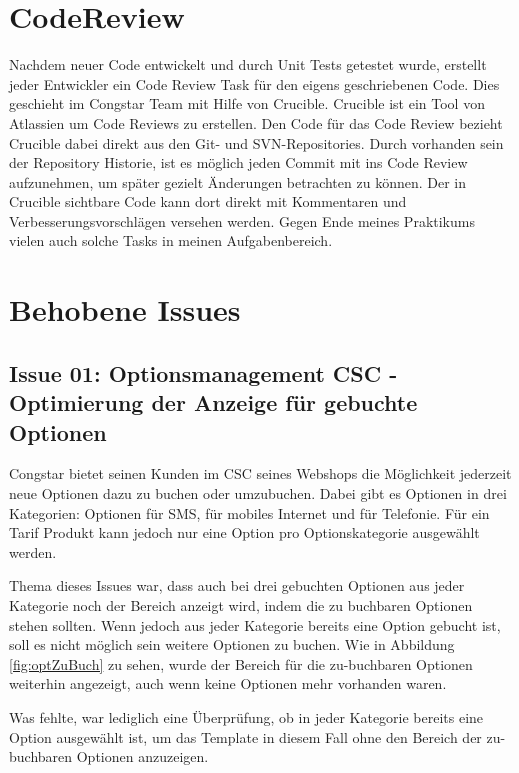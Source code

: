 \documentclass[11pt,a4paper]{article}
\begin{document}
\section{CodeReview}

Nachdem neuer Code entwickelt und durch Unit Tests getestet wurde, erstellt jeder Entwickler ein Code Review Task 
für den eigens geschriebenen Code. Dies geschieht im Congstar Team mit Hilfe von Crucible. Crucible ist ein Tool 
von Atlassien um Code Reviews zu erstellen. Den Code für das Code Review bezieht Crucible dabei direkt
aus den Git- und SVN-Repositories. Durch vorhanden sein der Repository Historie, ist es möglich jeden Commit
mit ins Code Review aufzunehmen, um später gezielt Änderungen betrachten zu können. Der in Crucible sichtbare Code
kann dort direkt mit Kommentaren und Verbesserungsvorschlägen versehen werden.
Gegen Ende meines Praktikums vielen auch solche Tasks in meinen Aufgabenbereich.


\section{Behobene Issues} \label{sec:issues}

\subsection{Issue 01: Optionsmanagement CSC - Optimierung der Anzeige für gebuchte Optionen}

Congstar bietet seinen Kunden im CSC seines Webshops die Möglichkeit jederzeit neue Optionen dazu zu buchen oder umzubuchen.
Dabei gibt es Optionen in drei Kategorien: Optionen für SMS, für mobiles Internet und für Telefonie.
Für ein Tarif Produkt kann jedoch nur eine Option pro Optionskategorie ausgewählt werden.

Thema dieses Issues war, dass auch bei drei gebuchten Optionen aus jeder Kategorie noch der Bereich anzeigt wird,
indem die zu buchbaren Optionen stehen sollten. Wenn jedoch aus jeder Kategorie bereits eine Option gebucht ist,
soll es nicht möglich sein weitere Optionen zu buchen. Wie in Abbildung \ref{fig:optZuBuch} zu sehen, wurde der 
Bereich für die zu-buchbaren Optionen weiterhin angezeigt, auch wenn keine Optionen mehr vorhanden waren.

Was fehlte, war lediglich eine Überprüfung, ob in jeder Kategorie bereits eine Option ausgewählt ist, um das Template
in diesem Fall ohne den Bereich der zu-buchbaren Optionen anzuzeigen.
\end{document}
